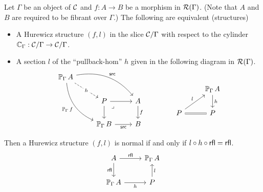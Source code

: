 \begin{proposition}\label{prop:hurewicz-equiv-defs}
  Let $\Gamma$ be an object of $\CC$ and
  $f : A \to B$ be a morphism in $\RR(\Gamma)$.
  (Note that $A$ and $B$ are required to be fibrant over $\Gamma$.)
  The following are equivalent (structures)
  \begin{itemize}
    \item A Hurewicz structure $(f,l)$ in the slice $\CC / \Gamma$ with respect to
      the cylinder $\cyl[\Gamma] : \CC / \Gamma \to \CC / \Gamma$.
    \item A section $l$ of the ``pullback-hom'' $h$
      given in the following diagram in $\RR(\Gamma)$.
      \[\begin{tikzcd}
      {\arr[\Gamma] A} && \\
      & P & A \\
      & {\arr[\Gamma] B} & B
      \arrow["h"{description}, dashed, from=1-1, to=2-2]
      \arrow["\src", bend left, from=1-1, to=2-3]
      \arrow["{\arr[\Gamma] f}"', bend right, from=1-1, to=3-2]
      \arrow[from=2-2, to=2-3]
      \arrow[from=2-2, to=3-2]
      \arrow["\lrcorner"{anchor=center, pos=0.125}, draw=none, from=2-2, to=3-3]
      \arrow["f", from=2-3, to=3-3]
      \arrow["\src"', from=3-2, to=3-3]
      \end{tikzcd}
      \quad \quad
      \quad \quad
      \begin{tikzcd}
        & {\arr[\Gamma] A} \\
        P & P
        \arrow["h", from=1-2, to=2-2]
        \arrow["l", from=2-1, to=1-2]
        \arrow[equals, from=2-1, to=2-2]
      \end{tikzcd} \]
  \end{itemize}

  Then a Hurewicz structure $(f,l)$ is normal
  if and only if $l \circ h \circ \rfl = \rfl$.
  \[\begin{tikzcd}
    A & {\arr[\Gamma] A} \\
    {\arr[\Gamma] A} & P
    \arrow["\rfl", from=1-1, to=1-2]
    \arrow["\rfl"', from=1-1, to=2-1]
    \arrow["h"', from=2-1, to=2-2]
    \arrow["l"', from=2-2, to=1-2]
  \end{tikzcd}\]
\end{proposition}

